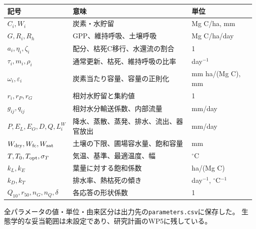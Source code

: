 \documentclass[a4paper,11pt]{ltjsarticle}
\newcommand{\code}[1]{\nolinkurl{#1}}
\begin{document}
\begin{longtable}{p{.24\linewidth}p{.43\linewidth}p{.24\linewidth}}
\toprule 記号 & 意味 & 単位\\\midrule\endhead
$C_i,W_i$ & 炭素・水貯留 & Mg C/ha, mm\\
$G,R_i,R_h$ & GPP、維持呼吸、土壌呼吸 & Mg C/ha/day\\
$a_i,\eta_i,\zeta_i$ & 配分、枯死C移行、水還流の割合 & 1\\
$\tau_i,m_i,\rho_i$ & 通常更新、枯死、維持呼吸の比率 & day$^{-1}$\\
$\omega_i,\varepsilon_i$ & 炭素当たり容量、容量の正則化 & mm ha/(Mg C), mm\\
$r_i,r_P,r_G$ & 相対水貯留と集約値 & 1\\
$g_{ij},q_{ij}$ & 相対水分輸送係数、内部流量 & mm/day\\
$P,E_L,E_O,D,Q,L_i^W$ & 降水、蒸散、蒸発、排水、流出、器官放出 & mm/day\\
$W_{\rm dry},W_{\rm fc},W_{\rm sat}$ & 土壌の下限、圃場容水量、飽和容量 & mm\\
$T,T_0,T_{\rm opt},\sigma_T$ & 気温、基準、最適温度、幅 & $^\circ$C\\
$k_L,k_E$ & 葉量に対する飽和係数 & ha/(Mg C)\\
$k_D,k_T$ & 排水率、熱枯死の傾き & day$^{-1}$, $^\circ$C$^{-1}$\\
$Q_{10},r_{50},n_G,n_Q,\delta$ & 各応答の形状係数 & 1\\
\bottomrule
\end{longtable}
全パラメータの値・単位・由来区分は出力先の\code{parameters.csv}に保存した。
生態学的な妥当範囲は未設定であり、研究計画のWP5に残している。
\end{document}
